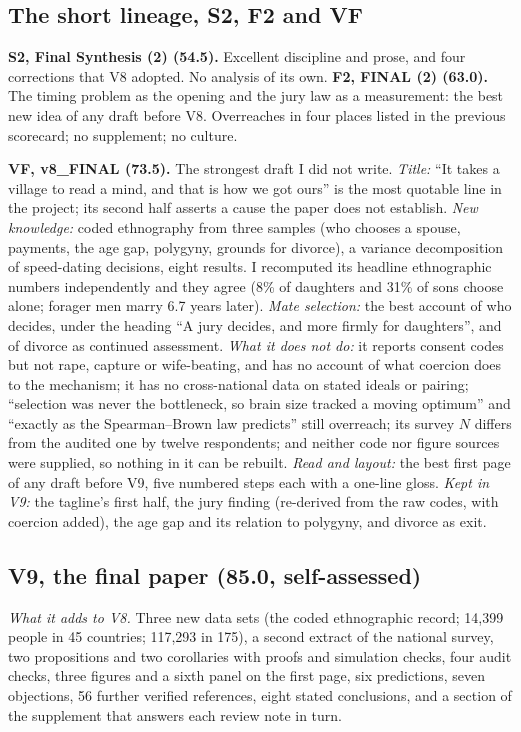 \documentclass[10pt,letterpaper]{extarticle}
\newcommand{\lab}[1]{\textbf{#1}}
\newcommand{\TotFtwo}{63.0}
\newcommand{\TotStwo}{54.5}
\newcommand{\TotVF}{73.5}
\newcommand{\TotVnine}{85.0}
\begin{document}
\subsection*{The short lineage, S2, F2 and VF}
\lab{S2, Final Synthesis (2) (\TotStwo).} Excellent discipline and prose, and four corrections that V8 adopted. No analysis of
its own. \lab{F2, FINAL (2) (\TotFtwo).} The timing problem as the opening and the jury law as a measurement: the best new
idea of any draft before V8. Overreaches in four places listed in the previous scorecard; no supplement; no culture.

\lab{VF, v8\_FINAL (\TotVF).} The strongest draft I did not write. \emph{Title:} ``It takes a village to read a mind, and
that is how we got ours'' is the most quotable line in the project; its second half asserts a cause the paper does not
establish. \emph{New knowledge:} coded ethnography from three samples (who chooses a spouse, payments, the age gap,
polygyny, grounds for divorce), a variance decomposition of speed-dating decisions, eight results. I recomputed its
headline ethnographic numbers independently and they agree (8\% of daughters and 31\% of sons choose alone; forager men
marry 6.7 years later). \emph{Mate selection:} the best account of who decides, under the heading ``A jury decides, and
more firmly for daughters'', and of divorce as continued assessment. \emph{What it does not do:} it reports consent codes
but not rape, capture or wife-beating, and has no account of what coercion does to the mechanism; it has no cross-national
data on stated ideals or pairing; ``selection was never the bottleneck, so brain size tracked a moving optimum'' and
``exactly as the Spearman--Brown law predicts'' still overreach; its survey $N$ differs from the audited one by twelve
respondents; and neither code nor figure sources were supplied, so nothing in it can be rebuilt. \emph{Read and layout:} the
best first page of any draft before V9, five numbered steps each with a one-line gloss. \emph{Kept in V9:} the tagline's first
half, the jury finding (re-derived from the raw codes, with coercion added), the age gap and its relation to polygyny, and
divorce as exit.

\subsection*{V9, the final paper (\TotVnine, self-assessed)}
\emph{What it adds to V8.} Three new data sets (the coded ethnographic record; 14{,}399 people in 45 countries; 117{,}293
in 175), a second extract of the national survey, two propositions and two corollaries with proofs and simulation checks,
four audit checks, three figures and a sixth panel on the first page, six predictions, seven objections, 56 further
verified references, eight stated conclusions, and a section of the supplement that answers each review note in turn.
\end{document}
